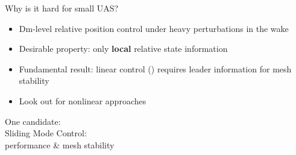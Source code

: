 \documentclass[]{beamer}
\begin{document}
\usebackgroundtemplate{}


\begin{frame}{Why is it hard for small UAS?}
\centering
\vspace{-6em}
\begin{tcolorbox}[width=.99\textwidth,
colback={gray!10!},
standard jigsaw,
opacityback=1,  %
]  
\begin{itemize}
\item Dm-level relative position control under heavy perturbations in the wake 
\item Desirable property: only \textbf{local} relative state information
\item Fundamental result: linear control (\cite{shaw2007controller}) requires leader information for mesh stability \cite{Seiler2004}
\item Look out for nonlinear approaches
\end{itemize}
\end{tcolorbox}
\end{frame}

\usebackgroundtemplate{}
\begin{frame}
\centering
\Large
\vspace{3em}
\begin{center}
One candidate: \\
Sliding Mode Control:\\
performance \& mesh stability
\end{center}
\end{frame}
\end{document}

